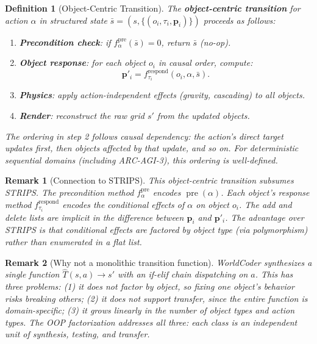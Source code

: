 \documentclass{article}
\newtheorem{definition}{Definition}
\newtheorem{remark}{Remark}
\DeclareMathOperator{\pre}{pre}
\begin{document}
\begin{definition}[Object-Centric Transition]
\label{def:oop_transition}
The \textbf{object-centric transition} for action $\alpha$ in structured state
$\bar{s} = (s, \{(o_i, \tau_i, \mathbf{p}_i)\})$ proceeds as follows:
\begin{enumerate}[nosep]
    \item \textbf{Precondition check}: if $f_\alpha^{\text{pre}}(\bar{s}) = 0$,
          return $\bar{s}$ (no-op).
    \item \textbf{Object response}: for each object $o_i$ in causal order,
          compute:
          \begin{equation}
          \mathbf{p}'_i = f_{\tau_i}^{\text{respond}}(o_i, \alpha, \bar{s}).
          \end{equation}
    \item \textbf{Physics}: apply action-independent effects (gravity,
          cascading) to all objects.
    \item \textbf{Render}: reconstruct the raw grid $s'$ from the updated
          objects.
\end{enumerate}
The ordering in step 2 follows causal dependency: the action's direct target
updates first, then objects affected by that update, and so on.  For
deterministic sequential domains (including ARC-AGI-3), this ordering is
well-defined.
\end{definition}

\begin{remark}[Connection to STRIPS]
\label{rem:strips_connection}
This object-centric transition subsumes STRIPS.  The precondition method
$f_\alpha^{\text{pre}}$ encodes $\pre(\alpha)$.  Each object's response method
$f_{\tau_i}^{\text{respond}}$ encodes the conditional effects of $\alpha$ on
object $o_i$.  The add and delete lists are implicit in the difference between
$\mathbf{p}_i$ and $\mathbf{p}'_i$.  The advantage over STRIPS is that
conditional effects are factored by object type (via polymorphism) rather
than enumerated in a flat list.
\end{remark}

\begin{remark}[Why not a monolithic transition function]
\label{rem:not_monolithic}
WorldCoder synthesizes a single function
$\hat{T}(s, a) \to s'$ with an if-elif chain dispatching on $a$.  This has
three problems: (1) it does not factor by object, so fixing one object's
behavior risks breaking others; (2) it does not support transfer, since
the entire function is domain-specific; (3) it grows linearly in the number
of object types and action types.  The OOP factorization addresses all three:
each class is an independent unit of synthesis, testing, and transfer.
\end{remark}
\end{document}
